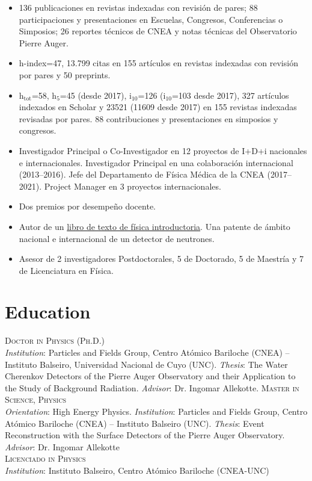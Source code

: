 \begin{itemize}
    \item {} 136 publicaciones en revistas indexadas con revisión de pares; 88 participaciones y presentaciones en Escuelas, Congresos, Conferencias o Simposios; 26 reportes técnicos de CNEA y notas técnicas del Observatorio Pierre Auger.
    \item {} h-index=47, 13.799 citas en 155 artículos en revistas indexadas con revisión por pares y 50 preprints.
    \item {} h$_{\text{tot}}$=58, h$_5$=45 (desde 2017), i$_{10}$=126 (i$_{10}$=103 desde 2017), 327 artículos indexados en Scholar y 23521 (11609 desde 2017) en 155 revistas indexadas revisadas por pares. 88 contribuciones y presentaciones en simposios y congresos.
    \item {} Investigador Principal o Co-Investigador en 12 proyectos de I+D+i nacionales e internacionales. Investigador Principal en una colaboración internacional (2013--2016). Jefe del Departamento de Física Médica de la CNEA (2017--2021). Project Manager en 3 proyectos internacionales.
    \item {} Dos premios por desempeño docente.
    \item {} Autor de un \href{https://editorial.unrn.edu.ar/index.php/catalogo/346/view_bl/62/lecturas-de-catedra/92/fisica-ia-de-las-galaxias-a-los-quarks}{libro de texto de física introductoria}. Una patente de ámbito nacional e internacional de un detector de neutrones.
    \item {} Asesor de 2 investigadores Postdoctorales, 5 de Doctorado, 5 de Maestría y 7 de Licenciatura en Física.
\end{itemize}
\fi

\ifeng
\section*{Education}
\noindent
{}\textsc{Doctor in Physics (Ph.D.)}\\
{\emph{Institution}}: Particles and Fields Group, Centro Atómico Bariloche (CNEA) -- Instituto Balseiro, Universidad Nacional de Cuyo (UNC). {\emph{Thesis}}: The Water Cherenkov Detectors of the Pierre Auger Observatory and their Application to the Study of Background Radiation. {\emph{Advisor}}: Dr. Ingomar Allekotte.
\textsc{Master in Science, Physics}\\
{\emph{Orientation}}: High Energy Physics. {\emph{Institution}}: Particles and Fields Group, Centro Atómico Bariloche (CNEA) -- Instituto Balseiro (UNC). {\emph{Thesis}}: Event Reconstruction with the Surface Detectors of the Pierre Auger Observatory. {\emph{Advisor}}: Dr. Ingomar Allekotte\\
\textsc{Licenciado in Physics}\\
{\emph{Institution}}: Instituto Balseiro, Centro Atómico Bariloche (CNEA-UNC)\\
\else
